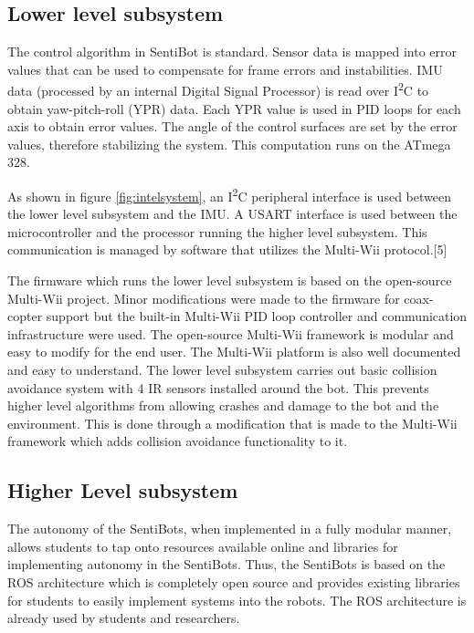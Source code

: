 \documentclass[12pt]{article}
\begin{document}
\subsection{Lower level subsystem}

The control algorithm in SentiBot is standard. Sensor data is mapped into error values that can be used to compensate for frame errors and instabilities. IMU data (processed by an internal Digital Signal Processor) is read over I\textsuperscript{2}C to obtain yaw-pitch-roll (YPR) data. Each YPR value is used in PID loops for each axis to obtain error values. The angle of the control surfaces are set by the error values, therefore stabilizing the system. This computation runs on the ATmega 328.

As shown in figure \ref{fig:intelsystem}, an I\textsuperscript{2}C peripheral interface is used between the lower level subsystem and the IMU. A USART interface is used between the microcontroller and the processor running the higher level subsystem. This communication is managed by software that utilizes the Multi-Wii protocol.[5]

The firmware which runs the lower level subsystem is based on the open-source Multi-Wii project. Minor modifications were made to the firmware for coax-copter support but the built-in Multi-Wii PID loop controller and communication infrastructure were used. The open-source Multi-Wii framework is modular and easy to modify for the end user. The Multi-Wii platform is also well documented and easy to understand. The lower level subsystem carries out basic collision avoidance system with 4 IR sensors installed around the bot. This prevents higher level algorithms from allowing crashes and damage to the bot and the environment. This is done through a modification that is made to the Multi-Wii framework which adds collision avoidance functionality to it.

\subsection{Higher Level subsystem}

The autonomy of the SentiBots, when implemented in a fully modular manner, allows students to tap onto resources available online and libraries for implementing autonomy in the SentiBots. Thus, the SentiBots is based on the ROS architecture which is completely open source and provides existing libraries for students to easily implement systems into the robots. The ROS architecture is already used by students and researchers.
\end{document}
